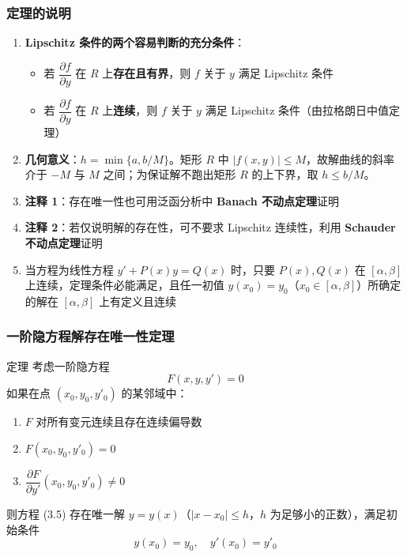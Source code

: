 \subsubsection{定理的说明}

\begin{enumerate}
    \item \textbf{Lipschitz 条件的两个容易判断的充分条件}：
    \begin{itemize}
        \item 若 $\dfrac{\partial f}{\partial y}$ 在 $R$ 上\textbf{存在且有界}，则 $f$ 关于 $y$ 满足 Lipschitz 条件
        \item 若 $\dfrac{\partial f}{\partial y}$ 在 $R$ 上\textbf{连续}，则 $f$ 关于 $y$ 满足 Lipschitz 条件（由拉格朗日中值定理）
    \end{itemize}
    \item \textbf{几何意义}：$h = \min\{a, b/M\}$。矩形 $R$ 中 $|f(x,y)| \le M$，故解曲线的斜率介于 $-M$ 与 $M$ 之间；为保证解不跑出矩形 $R$ 的上下界，取 $h \le b/M$。
    \item \textbf{注释 1}：存在唯一性也可用泛函分析中 \textbf{Banach 不动点定理}证明
    \item \textbf{注释 2}：若仅说明解的存在性，可不要求 Lipschitz 连续性，利用 \textbf{Schauder 不动点定理}证明
    \item 当方程为线性方程 $y' + P(x)y = Q(x)$ 时，只要 $P(x), Q(x)$ 在 $[\alpha, \beta]$ 上连续，定理条件必能满足，且任一初值 $y(x_0) = y_0$（$x_0 \in [\alpha,\beta]$）所确定的解在 $[\alpha, \beta]$ 上有定义且连续
\end{enumerate}

\subsubsection{一阶隐方程解存在唯一性定理}

\begin{myTheorem}{定理}
考虑一阶隐方程
\begin{equation}F(x, y, y') = 0 \tag{3.5}\end{equation}
如果在点 $(x_0, y_0, y'_0)$ 的某邻域中：
\begin{enumerate}
    \item $F$ 对所有变元连续且存在连续偏导数
    \item $F(x_0, y_0, y'_0) = 0$
    \item $\dfrac{\partial F}{\partial y'}(x_0, y_0, y'_0) \neq 0$
\end{enumerate}
则方程 (3.5) 存在唯一解 $y = y(x)$（$|x - x_0| \le h$，$h$ 为足够小的正数），满足初始条件
$$y(x_0) = y_0, \quad y'(x_0) = y'_0$$
\end{myTheorem}

